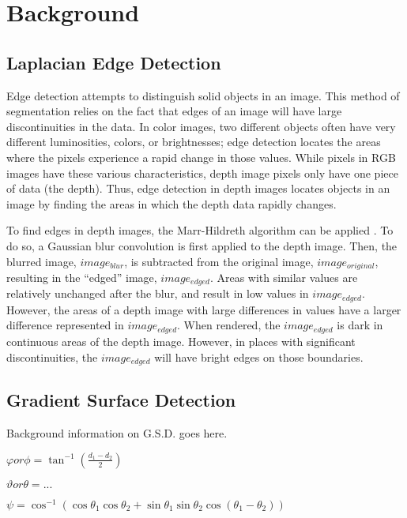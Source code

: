 
\section{Background}
\label{sec:background}

\subsection{Laplacian Edge Detection}
\label{subsec:laplacian}
Edge detection attempts to distinguish solid objects in an image. This
method of segmentation relies on the fact that edges of an image will
have large discontinuities in the data. In color images, two different
objects often have very different luminosities, colors, or
brightnesses; edge detection locates the areas where the pixels
experience a rapid change in those values. While pixels in RGB images
have these various characteristics, depth image pixels only have one
piece of data (the depth). Thus, edge detection in depth images
locates objects in an image by finding the areas in which the depth
data rapidly changes. 

To find edges in depth images, the Marr-Hildreth algorithm can be
applied \cite{marr}. To do so, a Gaussian blur convolution is first
applied to the depth image. Then, the blurred image, $image_{blur}$,
is subtracted from the original image, $image_{original}$, resulting
in the ``edged'' image, $image_{edged}$. Areas with similar values are
relatively unchanged after the blur, and result in low values in
$image_{edged}$. However, the areas of a depth image with large
differences in values have a larger difference represented in
$image_{edged}$. When rendered, the $image_{edged}$ is dark in
continuous areas of the depth image. However, in places with
significant discontinuities, the $image_{edged}$ will have bright
edges on those boundaries.

\subsection{Gradient Surface Detection}
\label{subsec:gradient}
Background information on G.S.D. goes here.

$\varphi or \phi  = \tan^{-1}{(\frac{d_1-d_2}{2})}$

$\vartheta or \theta = ...$

$\psi = \cos^{-1}{(\cos{\theta_1}\cos{\theta_2} + \sin{\theta_1}\sin{\theta_2}\cos{(\theta_1-\theta_2)})}$



